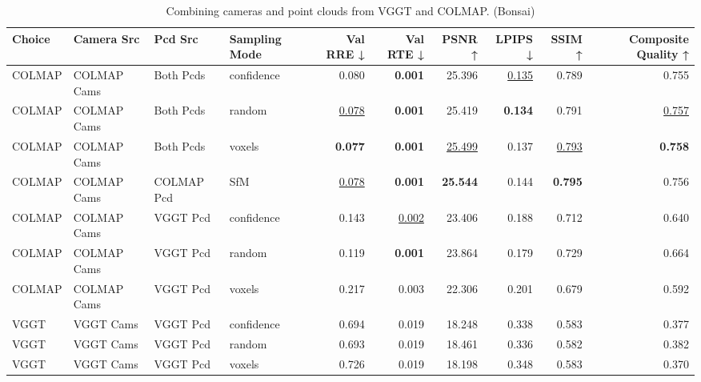 \begin{table}[H]
\caption{\ifdefined\customcaption \customcaption \else Combining cameras and point clouds from VGGT and COLMAP. (Bonsai) \fi}
\label{tab:07_combined_single_bonsai}
\centering
\tiny
\begin{tabular}{llllrrrrrr}
\toprule
Choice & Camera Src & Pcd Src & Sampling Mode & Val RRE ↓ & Val RTE ↓ & PSNR ↑ & LPIPS ↓ & SSIM ↑ & Composite Quality ↑ \\
\midrule
COLMAP & COLMAP Cams & Both Pcds & confidence & 0.080 & \textbf{0.001} & 25.396 & \underline{0.135} & 0.789 & 0.755 \\
COLMAP & COLMAP Cams & Both Pcds & random & \underline{0.078} & \textbf{0.001} & 25.419 & \textbf{0.134} & 0.791 & \underline{0.757} \\
COLMAP & COLMAP Cams & Both Pcds & voxels & \textbf{0.077} & \textbf{0.001} & \underline{25.499} & 0.137 & \underline{0.793} & \textbf{0.758} \\
COLMAP & COLMAP Cams & COLMAP Pcd & SfM & \underline{0.078} & \textbf{0.001} & \textbf{25.544} & 0.144 & \textbf{0.795} & 0.756 \\
COLMAP & COLMAP Cams & VGGT Pcd & confidence & 0.143 & \underline{0.002} & 23.406 & 0.188 & 0.712 & 0.640 \\
COLMAP & COLMAP Cams & VGGT Pcd & random & 0.119 & \textbf{0.001} & 23.864 & 0.179 & 0.729 & 0.664 \\
COLMAP & COLMAP Cams & VGGT Pcd & voxels & 0.217 & 0.003 & 22.306 & 0.201 & 0.679 & 0.592 \\
VGGT & VGGT Cams & VGGT Pcd & confidence & 0.694 & 0.019 & 18.248 & 0.338 & 0.583 & 0.377 \\
VGGT & VGGT Cams & VGGT Pcd & random & 0.693 & 0.019 & 18.461 & 0.336 & 0.582 & 0.382 \\
VGGT & VGGT Cams & VGGT Pcd & voxels & 0.726 & 0.019 & 18.198 & 0.348 & 0.583 & 0.370 \\
\bottomrule
\end{tabular}
\end{table}